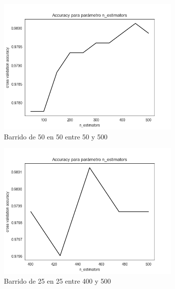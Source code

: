 \documentclass[11pt,a4paper]{article}
\theoremstyle{definition}
\begin{document}
	\begin{figure}[H]
		\centering
		\begin{subfigure}{.45\textwidth}
  		\centering
 		\includegraphics[width=1\textwidth]{images/n_est1}
 		\caption{Barrido de 50 en 50 entre 50 y 500}
  		\label{fig:sub1}
		\end{subfigure}
		\begin{subfigure}{.45\textwidth}
  		\centering
  		\includegraphics[width=1\textwidth]{images/n_est2}
  		\caption{Barrido de 25 en 25 entre 400 y 500}
  		\label{fig:sub2}
		\end{subfigure}
		\begin{subfigure}{.45\textwidth}
  		\centering

\end{subfigure}
\end{figure}
\end{document}
